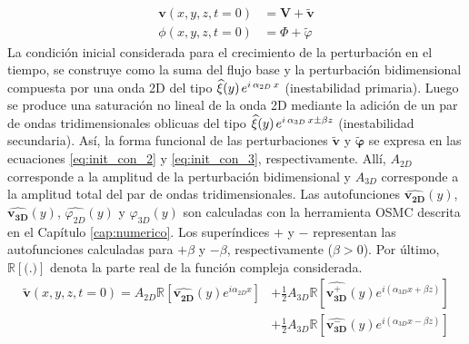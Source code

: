 \begin{equation}
\begin{aligned}
\mathbf{v}(x,y,z,t=0) &= \mathbf{V} + \widetilde{\mathbf{v}} \\
\phi(x,y,z,t=0) &= \Phi +  \widetilde{\varphi} 
\end{aligned}
\label{eq:init_con_1}
\end{equation}
La condición inicial considerada para el crecimiento de la perturbación en el tiempo, se \linebreak construye como la suma del flujo base y la perturbación bidimensional compuesta por una onda 2D del tipo $\widehat{\xi}(y) \hspace{0.5mm} e^{i \hspace{0.5mm} \alpha_{2D} \hspace{0.5mm} x }$ (inestabilidad primaria). Luego se produce una saturación no lineal de la onda 2D mediante la adición de un par de ondas tridimensionales oblicuas del tipo $\widehat{\xi}(y) \hspace{0.5mm} e^{i \hspace{0.5mm} \alpha_{3D} \hspace{0.5mm} x \pm \beta z  }$ (inestabilidad secundaria). Así, la forma funcional de las perturbaciones $\widetilde{\mathbf{v}}$ y $\widetilde{\mathbf{\varphi}}$ se expresa en las ecuaciones \ref{eq:init_con_2} y \ref{eq:init_con_3}, respectivamente. Allí, $A_{2D}$ corresponde a la \linebreak amplitud de la perturbación bidimensional y $A_{3D}$ corresponde a la amplitud total del par de ondas tridimensionales. Las autofunciones $\widehat{\mathbf{v^{}_{2D}}}(y)$, $\widehat{\mathbf{v^{}_{3D}}}(y)$, $\widehat{\varphi^{}_{2D}}(y)$ y $\widehat{\varphi^{}_{3D}}(y)$ son calculadas con la herramienta OSMC descrita en el Capítulo \ref{cap:numerico}. Los superíndices $+$ y $-$ representan las autofunciones calculadas para $+ \beta$ y $- \beta$, respectivamente ($\beta>0$). 
Por último, $\mathbb{R}[\text{(.)}]$ denota la parte real de la función compleja considerada.  
\begin{equation}
\begin{aligned}
\widetilde{\mathbf{v}}(x,y,z,t=0) = A_{2D} \mathbb{R} \left[ \widehat{\mathbf{v^{}_{2D}}}(y) e^{\mathit{i} \alpha_{2D} x} \right] &+ \frac{1}{2} A_{3D} \mathbb{R} \left[ \widehat{\mathbf{v^{+}_{3D}}}(y) e^{\mathit{i} ( \alpha_{3D} x + \beta z)} \right] \\
 &+ \frac{1}{2} A_{3D} \mathbb{R} \left[ \widehat{\mathbf{v^{-}_{3D}}}(y) e^{\mathit{i} ( \alpha_{3D} x - \beta z)} \right]
\end{aligned}
\label{eq:init_con_2}
\end{equation}


